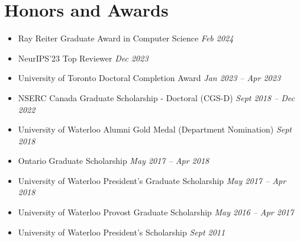 \section*{Honors and Awards}
\vspace{\postsubhead}
\begin{adjustwidth}{\indentleft}{\indentright}
  \begin{itemize}
    \setlength\itemsep{0.2em}

    \item Ray Reiter Graduate Award in Computer Science
    \hfill
    \textit{Feb 2024}

    \item NeurIPS'23 Top Reviewer
    \hfill
    \textit{Dec 2023}
    
    \item University of Toronto Doctoral Completion Award
    \hfill
    \textit{Jan 2023 -- Apr 2023}
    
    \item NSERC Canada Graduate Scholarship - Doctoral (CGS-D)
    \hfill
    \textit{Sept 2018 -- Dec 2022}
    
    \item University of Waterloo Alumni Gold Medal (Department Nomination)
    \hfill
    \textit{Sept 2018}
    
    \item Ontario Graduate Scholarship
    \hfill
    \textit{May 2017 -- Apr 2018}
    
    \item University of Waterloo President's Graduate Scholarship
    \hfill
    \textit{May 2017 -- Apr 2018}
    
    \item University of Waterloo Provost Graduate Scholarship
    \hfill
    \textit{May 2016 -- Apr 2017}
    
    \item University of Waterloo President's Scholarship
    \hfill
    \textit{Sept 2011}
    
    
    
    
  \end{itemize}
\end{adjustwidth}
